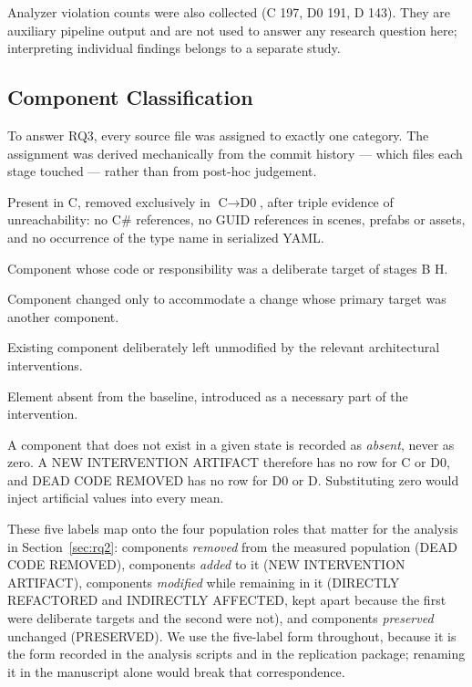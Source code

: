 \documentclass{sbc2019}%
\begin{document}
Analyzer violation counts were also collected (C 197, D0 191, D 143). They are
auxiliary pipeline output and are not used to answer any research question here;
interpreting individual findings belongs to a separate study.

\subsection{Component Classification}

To answer RQ3, every source file was assigned to exactly one category. The
assignment was derived mechanically from the commit history --- which files each
stage touched --- rather than from post-hoc judgement.

\begin{description}\itemsep2pt
\item[DEAD CODE REMOVED] Present in C, removed exclusively in $\text{C}\rightarrow\text{D0}$,
after triple evidence of unreachability: no C\# references, no GUID references in
scenes, prefabs or assets, and no occurrence of the type name in serialized YAML\@.
\item[DIRECTLY REFACTORED] Component whose code or responsibility was a deliberate
target of stages B\textendash{} H.
\item[INDIRECTLY AFFECTED] Component changed only to accommodate a change whose
primary target was another component.
\item[PRESERVED] Existing component deliberately left unmodified by the relevant
architectural interventions.
\item[NEW INTERVENTION ARTIFACT] Element absent from the baseline, introduced as a
necessary part of the intervention.
\end{description}

A component that does not exist in a given state is recorded as \emph{absent},
never as zero. A NEW INTERVENTION ARTIFACT therefore has no row for C or D0, and
DEAD CODE REMOVED has no row for D0 or D. Substituting zero would inject
artificial values into every mean.

These five labels map onto the four population roles that matter for the
analysis in Section~\ref{sec:rq2}: components \emph{removed} from the measured
population (DEAD CODE REMOVED), components \emph{added} to it (NEW INTERVENTION
ARTIFACT), components \emph{modified} while remaining in it (DIRECTLY REFACTORED
and INDIRECTLY AFFECTED, kept apart because the first were deliberate targets and
the second were not), and components \emph{preserved} unchanged (PRESERVED). We
use the five-label form throughout, because it is the form recorded in the
analysis scripts and in the replication package; renaming it in the manuscript
alone would break that correspondence.
\end{document}

